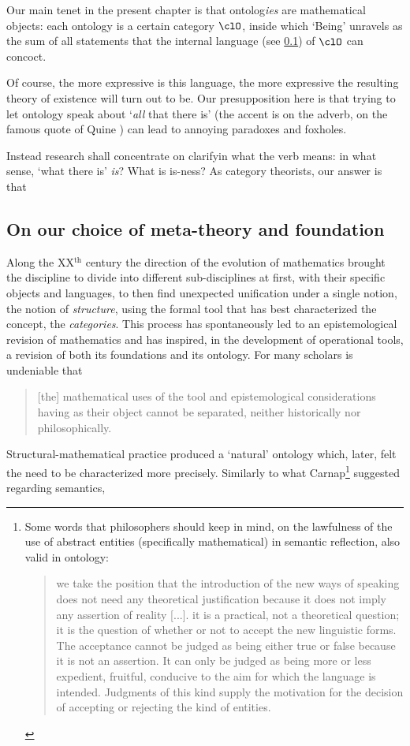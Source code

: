 Our main tenet in the present chapter is that ontolog\emph{ies} are mathematical objects: each ontology is a certain category $\clO$, inside which `Being' unravels as the sum of all statements that the internal language (see \ref{}) of $\clO$ can concoct. 

Of course, the more expressive is this language, the more expressive the resulting theory of existence will turn out to be. Our presupposition here is that trying to let ontology speak about `\emph{all} that there is' (the accent is on the adverb, on the famous quote of Quine \cite{}) can lead to annoying paradoxes and foxholes.

Instead research shall concentrate on clarifyin what the verb means: in what sense, `what there is' \emph{is}? What is is-ness? As category theorists, our answer is that 
\subsection{On our choice of meta-theory and foundation}
Along the XX$^\text{th}$ century the direction of the evolution of mathematics brought the discipline to divide into different sub-disciplines at first, with their specific objects and languages, to then find unexpected unification under a single notion, the notion of \emph{structure}, using the formal tool that has best characterized the concept, the \emph{categories}. This process has spontaneously led to an epistemological revision of mathematics and has inspired, in the development of operational tools, a revision of both its foundations and its ontology. For many scholars is undeniable that
\begin{quote}
    [the] mathematical uses of the tool \CT and epistemological considerations having \CT as their object cannot be separated, neither historically nor philosophically. \cite{kromer2007tool}
\end{quote}
Structural-mathematical practice produced a `natural' ontology which, later, felt the need to be characterized more precisely. Similarly to what Carnap\footnote{Some words that philosophers should keep in mind, on the lawfulness of the use of abstract entities (specifically mathematical) in semantic reflection, also valid in ontology:
    \begin{quote}
        we take the position that the introduction of the new ways of speaking does not need any theoretical justification because it does not imply any assertion of reality [...].  it is a practical, not a theoretical question; it is the question of whether or not to accept the new linguistic forms. The acceptance cannot be judged as being either true or false because it is not an assertion. It can only be judged as being more or less expedient, fruitful, conducive to the aim for which the language is intended. Judgments of this kind supply the motivation for the decision of accepting or rejecting the kind of entities. \hfill \cite{carnap1956meaning}
    \end{quote}} suggested regarding semantics,
